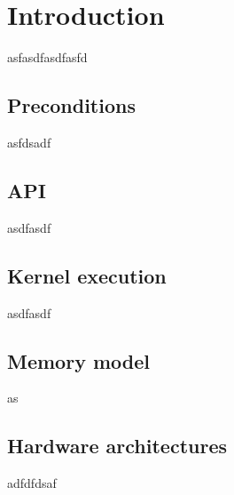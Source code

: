 \section{Introduction}
asfasdfasdfasfd

\subsection{Preconditions}
asfdsadf

\subsection{API}
asdfasdf

\subsection{Kernel execution}
asdfasdf

\subsection{Memory model}
as

\subsection{Hardware architectures}

adfdfdsaf